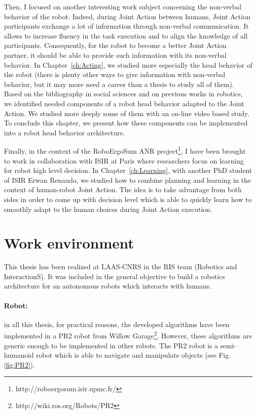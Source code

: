 \documentclass[english,a4paper,11pt,twoside]{StyleThese}
\begin{document}
Then, I focused on another interesting work subject concerning the non-verbal behavior of the robot. Indeed, during Joint Action between humans, Joint Action participants exchange a lot of information through non-verbal communication. It allows to increase fluency in the task execution and to align the knowledge of all participants. Consequently, for the robot to become a better Joint Action partner, it should be able to provide such information with its non-verbal behavior. In Chapter~\ref{ch:Acting}, we studied more especially the head behavior of the robot (there is plenty other ways to give information with non-verbal behavior, but it may more need a career than a thesis to study all of them). Based on the bibliography in social sciences and on previous works in robotics, we identified needed components of a robot head behavior adapted to the Joint Action. We studied more deeply some of them with an on-line video based study. To conclude this chapter, we present how these components can be implemented into a robot head behavior architecture.

Finally, in the context of the RoboErgoSum ANR project\footnote{http://roboergosum.isir.upmc.fr/}, I have been brought to work in collaboration with ISIR at Paris where researchers focus on learning for robot high level decision. In Chapter~\ref{ch:Learning}, with another PhD student of ISIR Erwan Renaudo, we studied how to combine planning and learning in the context of human-robot Joint Action. The idea is to take advantage from both sides in order to come up with decision level which is able to quickly learn how to smoothly adapt to the human choices during Joint Action execution.


\section*{Work environment}

This thesis has been realized at LAAS-CNRS in the RIS team (Robotics and InteractionS). It was included in the general objective to build a robotics architecture for an autonomous robots which interacts with humans. 

\paragraph{Robot:} in all this thesis, for practical reasons, the developed algorithms have been implemented in a PR2 robot from Willow Garage\footnote{http://wiki.ros.org/Robots/PR2}. However, these algorithms are generic enough to be implemented in other robots. The PR2 robot is a semi-humanoid robot which is able to navigate and manipulate objects (see Fig.\ref{fig:PR2}).
\end{document}
